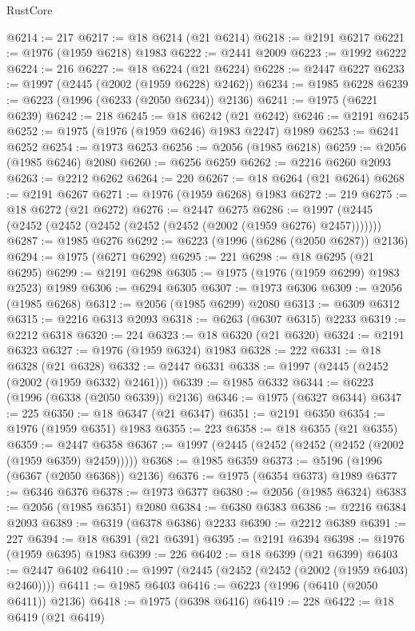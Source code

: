 \begin{lexlean}{RustCore}
\begin{coremodule}
@6214 := 217
@6217 := @18 @6214 (@21 @6214)
@6218 := @2191 @6217
@6221 := @1976 (@1959 @6218) @1983
@6222 := @2441 @2009
@6223 := @1992 @6222
@6224 := 216
@6227 := @18 @6224 (@21 @6224)
@6228 := @2447 @6227
@6233 := @1997 (@2445 (@2002 (@1959 @6228) @2462))
@6234 := @1985 @6228
@6239 := @6223 (@1996 (@6233 (@2050 @6234)) @2136)
@6241 := @1975 (@6221 @6239)
@6242 := 218
@6245 := @18 @6242 (@21 @6242)
@6246 := @2191 @6245
@6252 := @1975 (@1976 (@1959 @6246) @1983 @2247) @1989
@6253 := @6241 @6252
@6254 := @1973 @6253
@6256 := @2056 (@1985 @6218)
@6259 := @2056 (@1985 @6246) @2080
@6260 := @6256 @6259
@6262 := @2216 @6260 @2093
@6263 := @2212 @6262
@6264 := 220
@6267 := @18 @6264 (@21 @6264)
@6268 := @2191 @6267
@6271 := @1976 (@1959 @6268) @1983
@6272 := 219
@6275 := @18 @6272 (@21 @6272)
@6276 := @2447 @6275
@6286 := @1997 (@2445 (@2452 (@2452 (@2452 (@2452 (@2452 (@2002 (@1959 @6276) @2457)))))))
@6287 := @1985 @6276
@6292 := @6223 (@1996 (@6286 (@2050 @6287)) @2136)
@6294 := @1975 (@6271 @6292)
@6295 := 221
@6298 := @18 @6295 (@21 @6295)
@6299 := @2191 @6298
@6305 := @1975 (@1976 (@1959 @6299) @1983 @2523) @1989
@6306 := @6294 @6305
@6307 := @1973 @6306
@6309 := @2056 (@1985 @6268)
@6312 := @2056 (@1985 @6299) @2080
@6313 := @6309 @6312
@6315 := @2216 @6313 @2093
@6318 := @6263 (@6307 @6315) @2233
@6319 := @2212 @6318
@6320 := 224
@6323 := @18 @6320 (@21 @6320)
@6324 := @2191 @6323
@6327 := @1976 (@1959 @6324) @1983
@6328 := 222
@6331 := @18 @6328 (@21 @6328)
@6332 := @2447 @6331
@6338 := @1997 (@2445 (@2452 (@2002 (@1959 @6332) @2461)))
@6339 := @1985 @6332
@6344 := @6223 (@1996 (@6338 (@2050 @6339)) @2136)
@6346 := @1975 (@6327 @6344)
@6347 := 225
@6350 := @18 @6347 (@21 @6347)
@6351 := @2191 @6350
@6354 := @1976 (@1959 @6351) @1983
@6355 := 223
@6358 := @18 @6355 (@21 @6355)
@6359 := @2447 @6358
@6367 := @1997 (@2445 (@2452 (@2452 (@2452 (@2002 (@1959 @6359) @2459)))))
@6368 := @1985 @6359
@6373 := @5196 (@1996 (@6367 (@2050 @6368)) @2136)
@6376 := @1975 (@6354 @6373) @1989
@6377 := @6346 @6376
@6378 := @1973 @6377
@6380 := @2056 (@1985 @6324)
@6383 := @2056 (@1985 @6351) @2080
@6384 := @6380 @6383
@6386 := @2216 @6384 @2093
@6389 := @6319 (@6378 @6386) @2233
@6390 := @2212 @6389
@6391 := 227
@6394 := @18 @6391 (@21 @6391)
@6395 := @2191 @6394
@6398 := @1976 (@1959 @6395) @1983
@6399 := 226
@6402 := @18 @6399 (@21 @6399)
@6403 := @2447 @6402
@6410 := @1997 (@2445 (@2452 (@2452 (@2002 (@1959 @6403) @2460))))
@6411 := @1985 @6403
@6416 := @6223 (@1996 (@6410 (@2050 @6411)) @2136)
@6418 := @1975 (@6398 @6416)
@6419 := 228
@6422 := @18 @6419 (@21 @6419)

\end{coremodule}
\end{lexlean}
